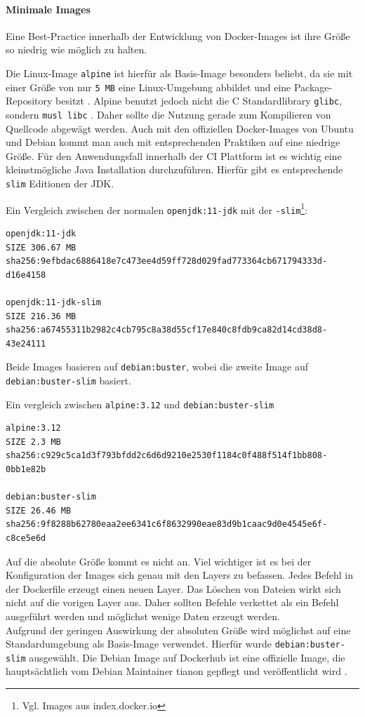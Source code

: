 \paragraph{Minimale Images}
Eine Best-Practice innerhalb der Entwicklung von Docker-Images ist ihre Größe so niedrig wie möglich zu halten. 

Die Linux-Image \lstinline{alpine} ist hierfür als Basis-Image besonders beliebt, da sie mit einer Größe von nur \lstinline{5 MB} eine Linux-Umgebung abbildet und eine Package-Repository besitzt \cite{docker-alpine}. Alpine benutzt jedoch nicht die C Standardlibrary \lstinline{glibc}, sondern \lstinline{musl libc} \cite{alpine-about}. Daher sollte die Nutzung gerade zum Kompilieren von Quellcode abgewägt werden.
Auch mit den offiziellen Docker-Images von Ubuntu und Debian kommt man auch mit entsprechenden Praktiken auf eine niedrige Größe. Für den Anwendungsfall innerhalb der \ac{CI} Plattform ist es wichtig eine kleinstmögliche Java Installation durchzuführen. Hierfür gibt es entsprechende \lstinline{slim} Editionen der JDK. 

Ein Vergleich zwischen der normalen \lstinline{openjdk:11-jdk} mit der \lstinline{-slim}\footnote{Vgl. Images aus index.docker.io}:
\begin{verbatim}
openjdk:11-jdk
SIZE 306.67 MB
sha256:9efbdac6886418e7c473ee4d59ff728d029fad773364cb671794333d-
d16e4158

openjdk:11-jdk-slim
SIZE 216.36 MB
sha256:a67455311b2982c4cb795c8a38d55cf17e840c8fdb9ca82d14cd38d8-
43e24111
\end{verbatim}

Beide Images basieren auf \lstinline{debian:buster}, wobei die zweite Image auf \lstinline{debian:buster-slim} basiert.

Ein vergleich zwischen \lstinline{alpine:3.12} und \lstinline{debian:buster-slim}
\begin{verbatim}
alpine:3.12
SIZE 2.3 MB
sha256:c929c5ca1d3f793bfdd2c6d6d9210e2530f1184c0f488f514f1bb808-
0bb1e82b

debian:buster-slim
SIZE 26.46 MB
sha256:9f8288b62780eaa2ee6341c6f8632990eae83d9b1caac9d0e4545e6f-
c8ce5e6d
\end{verbatim}

Auf die absolute Größe kommt es nicht an. Viel wichtiger ist es bei der Konfiguration der Images sich genau mit den Layers zu befassen. Jedes Befehl in der Dockerfile erzeugt einen neuen Layer. Das Löschen von Dateien wirkt sich nicht auf die vorigen Layer aus. Daher sollten Befehle verkettet als ein Befehl ausgeführt werden und möglichst wenige Daten erzeugt werden. 
\medskip
\\
Aufgrund der geringen Auswirkung der absoluten Größe wird möglichst auf eine Standardumgebung als Basis-Image verwendet. Hierfür wurde \lstinline{debian:buster-slim} ausgewählt. Die Debian Image auf Dockerhub ist eine offizielle Image, die hauptsächtlich vom Debian Maintainer tianon gepflegt und veröffentlicht wird \cite{docker-debian-builds, docker-debian}.

